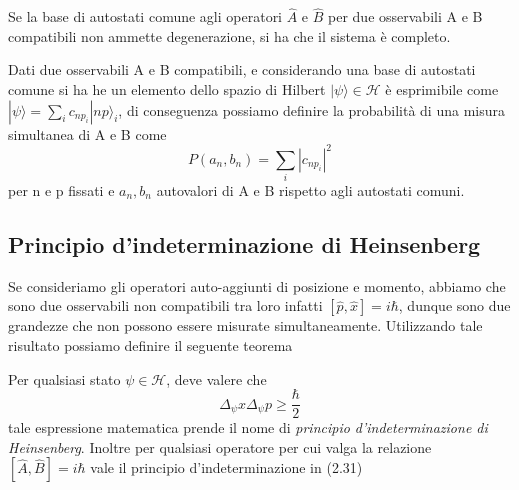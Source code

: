  \begin{definition}
 	Se la base di autostati comune agli operatori $\hat{A}$ e $\hat{B}$ per due osservabili A e B compatibili non ammette degenerazione, si ha che il sistema \`e completo.
 \end{definition}
 
  \noindent Dati due osservabili A e B compatibili, e considerando una base di autostati comune si ha he un elemento dello spazio di Hilbert $|\psi \rangle \in \mathcal{H}$ \`e esprimibile come $|\psi \rangle = \sum_{i} c_{np_{i}} |np \rangle_i $, di conseguenza possiamo definire la probabilit\`a di una misura simultanea di A e B come 
  \begin{equation*}
  	P(a_n,b_n) = \sum_{i}|c_{np_{i}}|^2
  \end{equation*}
per n e p fissati e $a_n,b_n$ autovalori di A e B rispetto agli autostati comuni.

\subsection{Principio d'indeterminazione di Heinsenberg}

Se consideriamo gli operatori auto-aggiunti di posizione e momento, abbiamo che sono due osservabili non compatibili tra loro infatti $[\hat{p},\hat{x} ] = i \hbar $, dunque sono due grandezze che non possono essere misurate simultaneamente. Utilizzando tale risultato possiamo definire il seguente teorema
\newpage
 
\begin{theorem}
	Per qualsiasi stato $\psi \in \mathcal{H}$, deve valere che
	\begin{equation}
		\Delta_{\psi}x\Delta_{\psi}p \geq \frac{\hbar}{2} 
	\end{equation}
tale espressione matematica prende il nome di \textit{principio d'indeterminazione di Heinsenberg}. Inoltre per qualsiasi operatore per cui valga la relazione $[\hat{A},\hat{B}] = i\hbar$ vale il principio d'indeterminazione in (2.31) 
\end{theorem}

